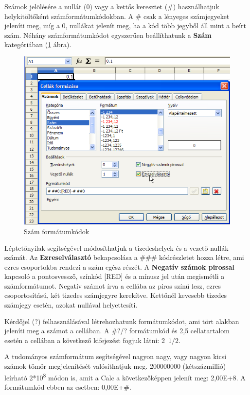 Számok jelölésére a nullát (0) vagy a kettős keresztet
(\#) használhatjuk helykitöltőként
számformátumkódokban. A \# csak a lényeges számjegyeket
jeleníti meg, míg a 0, nullákat jelenít meg, ha a kód több
jegyből áll mint a beírt szám. Néhány
számformátumkódot egyszerűen beállíthatunk a
\textbf{Szám} kategóriában (\ref{SzámFormátumkódok} ábra).

\begin{figure}[!h]
\begin{center}
\includegraphics[width=15.027cm]{oocalcv1-img51.png}
\caption{Szám formátumkódok}\label{SzámFormátumkódok}
\end{center}
\end{figure}

Léptetőnyilak segítségével módosíthatjuk a tizedeshelyek
és a vezető nullák számát. Az \textbf{Ezreselválasztó}
bekapcsolása a \#\#\# kódrészletet hozza létre, ami ezres
csoportokba rendezi a szám egész részét. A \textbf{Negatív
számok pirossal} kapcsoló a pontosvessző, színkód [RED]
és a mínusz jel után megismétli a számformátumot. Negatív
számot írva a cellába az piros színű lesz, ezres
csoportosítású, két tizedes számjegyre kerekítve.
Kettőnél kevesebb tizedes számjegy esetén, azokat nullával
helyettesíti.

Kérdőjel (?) felhasználásával létrehozhatunk
formátumkódot, ami tört alakban jeleníti meg a számot a
cellában. A \#?/? formátumkód és 2,5 cellatartalom esetén a
cellában a következő kifejezést fogjuk látni: 2~$1/2$.

A tudományos számformátum segítségével nagyon nagy, vagy
nagyon kicsi számok tömör megjelenítését valósíthatjuk
meg. 200000000 (kétszázmillió) leírható
2*10\textsuperscript{8} módon is, amit a Calc a
következőképpen jelenít meg: 2,00E+8. A formátumkód ebben
az esetben: 0,00E+\#.

